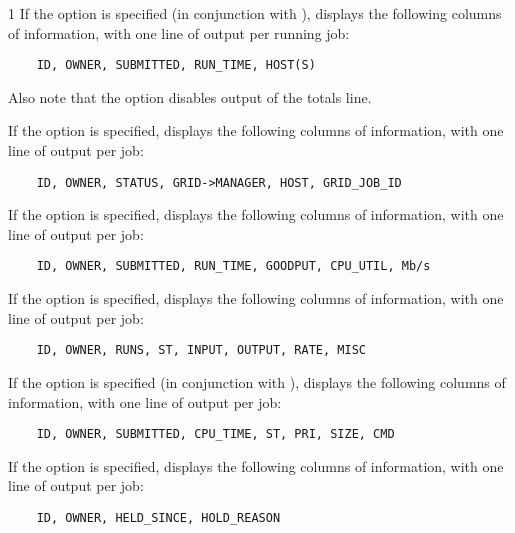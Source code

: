 \begin{ManPage}{\label{man-condor-q}}{1}
If the  option is specified (in conjunction with ),
 displays the following columns of information, with one line
of output per running job:
\begin{verbatim}
    ID, OWNER, SUBMITTED, RUN_TIME, HOST(S)
\end{verbatim}
Also note that the  option disables output of the
totals line.


If the  option is specified,  displays the
following columns of information, with one line of output per job:
\begin{verbatim}
    ID, OWNER, STATUS, GRID->MANAGER, HOST, GRID_JOB_ID
\end{verbatim}

If the  option is specified,  displays the
following columns of information, with one line of output per job:
\begin{verbatim}
    ID, OWNER, SUBMITTED, RUN_TIME, GOODPUT, CPU_UTIL, Mb/s
\end{verbatim}

If the  option is specified,  displays the
following columns of information, with one line of output per job:
\begin{verbatim}
    ID, OWNER, RUNS, ST, INPUT, OUTPUT, RATE, MISC
\end{verbatim}

If the  option is specified (in conjunction with ),
 displays the
following columns of information, with one line of output per job:
\begin{verbatim}
    ID, OWNER, SUBMITTED, CPU_TIME, ST, PRI, SIZE, CMD
\end{verbatim}

If the  option is specified,  displays the
following columns of information, with one line of output per job:
\begin{verbatim}
    ID, OWNER, HELD_SINCE, HOLD_REASON
\end{verbatim}


\end{ManPage}
